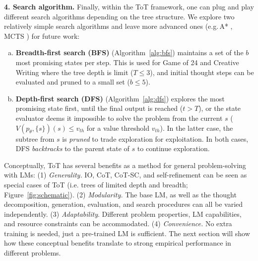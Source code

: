 \documentclass{article}
\begin{document}
\textbf{4. Search algorithm.} Finally, within the ToT framework, one can plug and play different search algorithms depending on the tree structure. We explore two relatively simple search algorithms and leave more advanced ones (e.g.\,A* \cite{hart1968formal}, MCTS \cite{Browne2012ASO}) for future work:
\vspace{-7pt}
\begin{enumerate}[(a)]
\item 
\textbf{Breadth-first search (BFS)} (Algorithm~\ref{alg:bfs}) maintains a set of the $b$ most promising states per step. This is used for Game of 24 and Creative Writing where the tree depth is limit ($T \le 3$), and initial thought steps can be evaluated and pruned to a small set ($b \le 5$). 
\item 
\textbf{Depth-first search (DFS)} (Algorithm~\ref{alg:dfs}) explores the most promising state first, until the final output is reached ($t > T$), or the state evaluator deems it impossible to solve the problem from the current $s$ ($V(p_\theta, \{s\})(s) \le v_{th}$ for a value threshold $v_{th}$). In the latter case, the subtree from $s$ is {\em pruned} to trade exploration for exploitation. In both cases, DFS {\em backtracks} to the parent state of $s$ to continue exploration. 
\vspace{-7pt}
\end{enumerate}




Conceptually, ToT has several benefits as a method for general problem-solving with LMs: (1) {\em Generality.} IO, CoT, CoT-SC, and self-refinement can be seen as special cases of ToT (i.e. trees of limited depth and breadth; Figure~\ref{fig:schematic}). (2) {\em Modularity.}  The base LM, as well as the  thought decomposition, generation, evaluation, and search procedures can all be varied independently. (3) {\em Adaptability}. Different problem properties, LM capabilities, and resource constraints can be accommodated.  (4) {\em Convenience.} No extra training is needed, just a pre-trained LM is sufficient. The next section will show how these conceptual benefits translate to strong empirical performance in different problems. %
\end{document}
